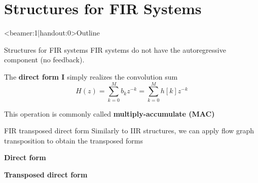 \documentclass[10pt, handout]{beamer}
\begin{document}
\section{Structures for FIR Systems}
\begin{frame}<beamer:1|handout:0>{Outline}
\tableofcontents[currentsection]
\end{frame}

\begin{frame}{Structures for FIR systems}
FIR systems do not have the autoregressive component (no feedback). 

The \textbf{direct form I} simply realizes the convolution sum
\begin{equation*}
H(z) = \sum_{k = 0}^Mb_kz^{-k} = \sum_{k = 0}^M h[k]z^{-k}
\end{equation*}

\begin{center}
	\resizebox{\textwidth}{!}{}
\end{center}

This operation is commonly called\textbf{ multiply-accumulate (MAC)}

\end{frame}

\begin{frame}{FIR transposed direct form}
Similarly to IIR structures, we can apply flow graph transposition to obtain the transposed forms

\textbf{Direct form}
\begin{center}
	\resizebox{0.9\textwidth}{!}{}
\end{center}

\textbf{Transposed direct form}
\begin{center}
	\resizebox{0.9\textwidth}{!}{}
\end{center}

\end{frame}
\end{document}
